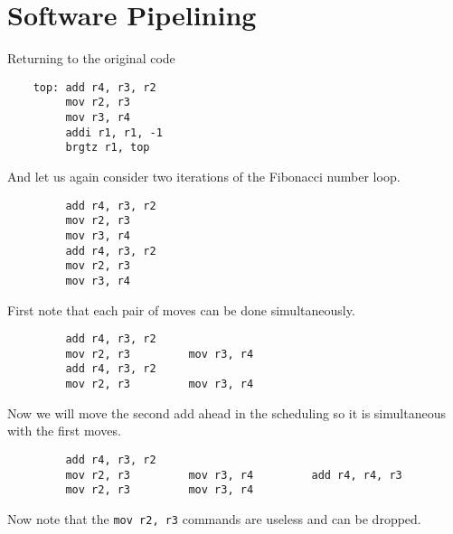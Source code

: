\documentclass{article}
\begin{document}



\section{Software Pipelining}

Returning to the original code

\begin{verbatim}
    top: add r4, r3, r2
         mov r2, r3
         mov r3, r4
         addi r1, r1, -1
         brgtz r1, top
\end{verbatim}

And let us again consider two iterations of the Fibonacci number loop.

\begin{verbatim}
         add r4, r3, r2
         mov r2, r3
         mov r3, r4
         add r4, r3, r2
         mov r2, r3
         mov r3, r4
\end{verbatim}

First note that each pair of moves can be done simultaneously.

\begin{verbatim}
         add r4, r3, r2
         mov r2, r3         mov r3, r4
         add r4, r3, r2
         mov r2, r3         mov r3, r4
\end{verbatim}

Now we will move the second add ahead in the scheduling so it is simultaneous with the first moves.

\begin{verbatim}
         add r4, r3, r2
         mov r2, r3         mov r3, r4         add r4, r4, r3
         mov r2, r3         mov r3, r4
\end{verbatim}

Now note that the \texttt{mov r2, r3} commands are useless and can be dropped.
\end{document}
